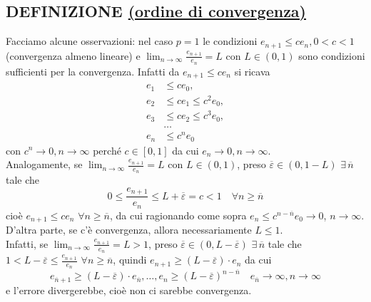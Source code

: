\documentclass[12pt]{article}
\begin{document}
\subsection{DEFINIZIONE \uline{(ordine di convergenza)}}
\begin{center}
\end{center}
Facciamo alcune osservazioni: nel caso $p=1$ le condizioni $e_{n+1} \leq ce_n, 0<c<1$  (convergenza almeno lineare) e $\lim_{n\to\infty}{\frac{e_{n+1}}{e_n}}=L$ con $L\in(0,1)$ sono condizioni sufficienti per la convergenza. Infatti da $e_{n+1}\leq ce_n$ si ricava 
\[\begin{split}
    e_1 & \leq ce_0, \\
    e_2 & \leq ce_1 \leq c^2e_0, \\
    e_3 & \leq ce_2 \leq c^3e_0, \\
    & \dotso \\
    e_n & \leq c^ne_0
\end{split}\] 
con $c^n\rightarrow 0,n\rightarrow\infty$ perché $c\in[0,1]$ da cui $e_n\rightarrow 0, n\rightarrow\infty$. \\
Analogamente, se $\lim_{n\to \infty}{\frac{e_{n+1}}{e_n}}=L$ con $L\in(0,1)$, preso $\overline{\varepsilon}\in(0,1-L)$ $\exists\, \overline{n}$ tale che 
\[0\leq\frac{e_{n+1}}{e_n}\leq L+\overline{\varepsilon}=c<1 \quad\forall n \geq \overline{n}\] 
cioè $e_{n+1}\leq ce_n$ $\forall n\geq\overline{n}$, da cui ragionando come sopra $e_n \leq c^{n-\overline{n}}e_0 \rightarrow 0$, $n\rightarrow\infty$.\\
D'altra parte, se c'è convergenza, allora necessariamente $L\le 1$.\\
Infatti, se $\lim_{n \to \infty} \frac{e_{n+1}}{e_n} = L > 1$, preso $\overline{\varepsilon} \in (0, L-\overline{\varepsilon})$ $ \exists\, \overline{n}$ tale che $1<L-\overline{\varepsilon} \leq \frac{e_{n+1}}{e_n}$ $\forall n \geq \overline{n}$, quindi $e_{n+1} \geq (L-\overline{\varepsilon})\cdot e_n$ da cui 
\[e_{\overline{n}+1} \geq (L-\overline{\varepsilon}) \cdot e_{\overline{n}}, \dotso, e_n \geq (L-\overline{\varepsilon})^{n-\overline{n}}\quad e_{\overline{n}} \to \infty, n \to \infty\]
e l'errore divergerebbe, cioè non ci sarebbe convergenza.
\end{document}
